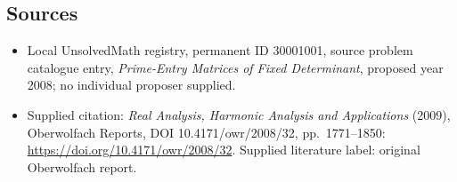 \documentclass[11pt]{article}
\begin{document}
\subsection{Sources}
\begin{itemize}\item Local UnsolvedMath registry, permanent ID 30001001, source problem catalogue entry, \emph{Prime-Entry Matrices of Fixed Determinant}, proposed year 2008; no individual proposer supplied.\item Supplied citation: \emph{Real Analysis, Harmonic Analysis and Applications} (2009), Oberwolfach Reports, DOI 10.4171/owr/2008/32, pp.\ 1771--1850: \url{https://doi.org/10.4171/owr/2008/32}. Supplied literature label: original Oberwolfach report.\end{itemize}
\end{document}
